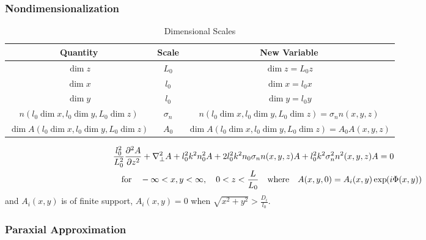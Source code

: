 \subsubsection{Nondimensionalization}

\begin{table}[htp]
\begin{center}
\begin{tabular}{|c|c|c|}
\hline
Quantity                 & Scale                & New Variable        \\       
\hline
\hline
$\dim{z}$                & $L_0$                & $\dim{z} = L_0 z$   \\                   
\hline
$\dim{x}$                & $l_0$                & $\dim{x} = l_0  x$  \\
\hline
$\dim{y}$                & $l_0$                & $\dim{y} = l_0  y$  \\
\hline
$n(l_0 \dim{x}, l_0 \dim{y}, L_0 \dim{z})$ & $\sigma_n$ & $n(l_0 \dim{x}, l_0 \dim{y}, L_0 \dim{z}) = \sigma_n n(x,y,z)$  \\
\hline
$\dim{A}(l_0 \dim{x}, l_0 \dim{y}, L_0 \dim{z})$ &  $A_0$  & $\dim{A}(l_0 \dim{x}, l_0 \dim{y}, L_0 \dim{z}) = A_0 A(x,y,z)$ \\
\hline   
\end{tabular}
\end{center}
\caption{Dimensional Scales}
\label{Dimensional Scales}
\end{table}


\begin{equation}
\begin{split}
  & \frac{l_0^2}{L_0^2} \ppder{A}{z} + \nabla_{\perp}^2 A + l_0^2 k^2 n_0^2 A 
  +  2 l_0^2k^2 n_0 \sigma_n n(x,y,z) A + l_0^2k^2 \sigma_n^2 n^2(x,y,z) A = 0 \\
  &\quad  \mbox{for}   
  \quad -\infty < x,y < \infty, \quad 0 < z < \frac{L}{L_0} \quad  
  \mbox{where} \quad A(x,y,0) = A_{i}(x,y)\exp{i \Phi(x,y)}
\end{split}
\end{equation}
and $A_{i}(x,y)$ is of finite support, \ie $A_{i}(x,y) = 0$ when $\sqrt{x^2 + y^2} > \frac{D_{i}}{l_0}$.


\subsubsection{Paraxial Approximation }

